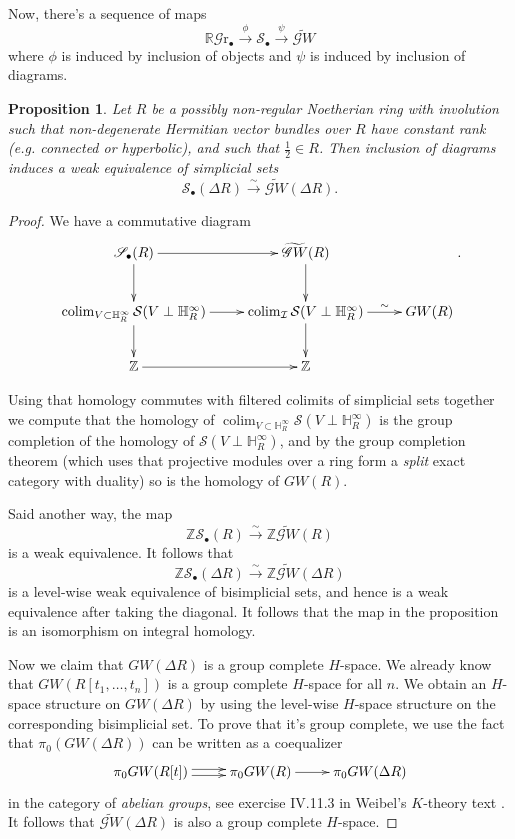 \documentclass[edeposit,fullpage]{uiucthesis2009}
\newcommand{\Z}{\mathbb Z}
\newcommand{\mbb}{\mathbb}
\newcommand{\mc}{\mathcal}
\newcommand{\hRGr}{\mathbb R\mathscr{G}{\mathrm{r}}}
\DeclareMathOperator*{\colim}{colim}
\theoremstyle{plain}
\numberwithin{lemma}{section}
\newtheorem{proposition}[lemma]{Proposition}
\theoremstyle{definition}
\begin{document}
Now, there's a sequence of maps
\[
\hRGr_\bullet \xrightarrow{\phi} \mathscr S_\bullet \xrightarrow{\psi}
\widetilde{\mathscr GW}
\]
where $\phi$ is induced by inclusion of objects and $\psi$ is induced
by inclusion of diagrams. 

\begin{proposition}\label{prop:Bet_GW}
Let $R$ be a possibly non-regular Noetherian ring with involution
such that
non-degenerate Hermitian vector bundles over $R$ have constant rank (e.g. connected or hyperbolic),
and such that $\frac{1}{2} \in R$. Then inclusion of diagrams induces
a weak equivalence of simplicial sets
\[
\mathscr S_\bullet(\Delta R) \xrightarrow{\sim} \widetilde{\mathscr{G}W}(\Delta R).
\]
\end{proposition}



\begin{proof}
We have a commutative diagram
\[
\xymatrix{\mathscr S_\bullet(R) \ar[r]\ar[d] &
  \widetilde{\mathscr{G}W}( R) \ar[d] \\
\colim_{V \subset \mbb H_R^\infty} \mc S(V \perp\mbb H_R^\infty) \ar[r]
\ar[d] & \colim_{\mc I}\mc S(V \perp\mbb H_R^\infty)  \ar[d] \ar[r]^-\sim
& GW(R)\\
\Z \ar[r] & \Z}.
\]

Using that homology commutes with filtered colimits of simplicial
sets together we compute that the homology of $\colim_{V \subset \mbb
  H_R^\infty} \mc S(V \perp\mbb H_R^\infty)$ is the group completion
of the homology of $\mc S(V \perp\mbb H_R^\infty)$, and by the group
completion theorem (which uses that projective modules over a ring
form a \emph{split} exact category with duality) so is the homology of $GW(R)$.

 Said another way, the
map
\[
\Z\mathscr S_\bullet( R) \xrightarrow{\sim} \Z\widetilde{\mathscr{G}W}( R)
\]
is a weak equivalence. It follows that
\[
\Z\mathscr S_\bullet(\Delta R) \xrightarrow{\sim} \Z\widetilde{\mathscr{G}W}(\Delta R)
\]
is a level-wise weak equivalence of bisimplicial sets, and hence is a
weak equivalence after taking the diagonal. It follows that the map in
the proposition is an isomorphism on integral homology. 

Now we claim that $GW(\Delta R)$ is a group complete $H$-space. We
already know that
$GW(R[t_1,\dots,t_n])$ is a group complete $H$-space for all $n$. We
obtain an $H$-space structure on $GW(\Delta R)$ by using the
level-wise $H$-space structure on the corresponding bisimplicial
set. To prove that it's group complete, we use the fact that
$\pi_0(GW(\Delta R))$ can be written as a coequalizer
\[
\xymatrix{\pi_0GW(R[t]) \ar@<0.5ex>[r] \ar@<-0.5ex>[r] & \pi_0GW(R)
  \ar[r] & \pi_0GW(\Delta R)}
\]
in the category of \emph{abelian groups}, see exercise IV.11.3 in
Weibel's $K$-theory text \cite{Kbook}. It follows that $\widetilde{\mathscr GW}(\Delta R)$ is also a group complete $H$-space. 


\end{proof}
\end{document}

